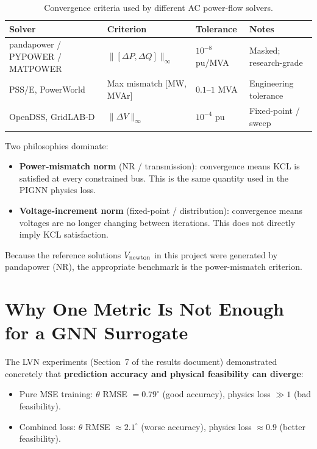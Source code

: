 \documentclass{article}
\begin{document}
\begin{table}[h]
\centering
\caption{Convergence criteria used by different AC power-flow solvers.}
\label{tab:solvers}
\begin{tabular}{p{3.8cm}p{3.2cm}p{2.2cm}p{2.8cm}}
\toprule
Solver & Criterion & Tolerance & Notes \\
\midrule
pandapower / PYPOWER / MATPOWER
  & $\|[\Delta P, \Delta Q]\|_\infty$
  & $10^{-8}$ pu/MVA
  & Masked; research-grade \\[3pt]
PSS/E, PowerWorld
  & Max mismatch [MW, MVAr]
  & $0.1$--$1$ MVA
  & Engineering tolerance \\[3pt]
OpenDSS, GridLAB-D
  & $\|\Delta V\|_\infty$
  & $10^{-4}$ pu
  & Fixed-point / sweep \\
\bottomrule
\end{tabular}
\end{table}

Two philosophies dominate:

\begin{itemize}[noitemsep]
  \item \textbf{Power-mismatch norm} (NR / transmission): convergence means
    KCL is satisfied at every constrained bus.  This is the same quantity
    used in the PIGNN physics loss.
  \item \textbf{Voltage-increment norm} (fixed-point / distribution):
    convergence means voltages are no longer changing between iterations.
    This does not directly imply KCL satisfaction.
\end{itemize}

Because the reference solutions $V_{\rm newton}$ in this project were
generated by pandapower (NR), the appropriate benchmark is the
power-mismatch criterion.

\section{Why One Metric Is Not Enough for a GNN Surrogate}

The LVN experiments (Section~7 of the results document) demonstrated
concretely that \textbf{prediction accuracy and physical feasibility can
diverge}:

\begin{itemize}[noitemsep]
  \item Pure MSE training: $\theta$ RMSE $= 0.79^\circ$ (good accuracy),
    physics loss $\gg 1$ (bad feasibility).
  \item Combined loss: $\theta$ RMSE $\approx 2.1^\circ$ (worse accuracy),
    physics loss $\approx 0.9$ (better feasibility).
\end{itemize}
\end{document}
